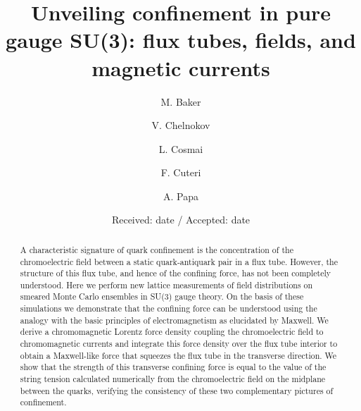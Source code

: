 \documentclass[pdftex,twocolumn,epjc3,envcountsect]{svjour3}
\begin{document}
\title{Unveiling confinement in pure gauge SU(3):
flux tubes, fields,  and magnetic currents}

\author{M. Baker
\and
V. Chelnokov
\and
L. Cosmai
\and
F. Cuteri
\and
A. Papa
}



\date{Received: date / Accepted: date}

\maketitle

\begin{abstract}
 A characteristic signature of quark confinement is the concentration of the chromoelectric field between a static quark-antiquark pair in a flux tube. However, the structure of this flux tube, and hence of the confining force, has not been completely understood. Here we perform new lattice measurements of field distributions on smeared Monte Carlo ensembles in SU(3) gauge theory. On the basis of these simulations we demonstrate that the confining force can be understood using the analogy with the basic principles of electromagnetism as elucidated by Maxwell.
 We derive a 
 chromomagnetic Lorentz force density coupling the chromoelectric field to chromomagnetic currents and integrate this force density over the flux tube interior to obtain a Maxwell-like force that squeezes the flux tube in the transverse direction. We show that the strength of this transverse confining force is equal to the value of the string tension calculated numerically from  the chromoelectric field on the midplane between the quarks, verifying the consistency of these two complementary pictures of confinement.
\end{abstract}
\end{document}
